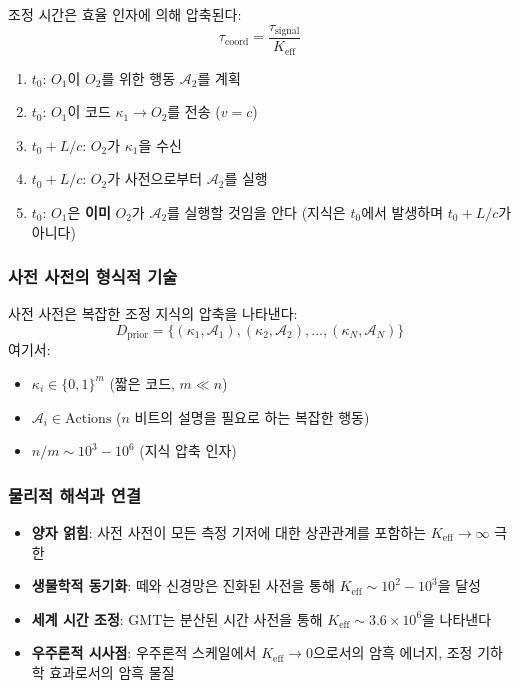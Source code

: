 \documentclass[11pt,a4paper]{article}
\begin{document}
조정 시간은 효율 인자에 의해 압축된다:
\begin{equation}
	\tau_{\text{coord}} = \frac{\tau_{\text{signal}}}{K_{\mathrm{eff}}}
\end{equation}

\begin{enumerate}[label=\arabic*.]
	\item $t_0$: $O_1$이 $O_2$를 위한 행동 $\mathcal{A}_2$를 계획
	\item $t_0$: $O_1$이 코드 $\kappa_1 \to O_2$를 전송 ($v = c$)
	\item $t_0 + L/c$: $O_2$가 $\kappa_1$을 수신
	\item $t_0 + L/c$: $O_2$가 사전으로부터 $\mathcal{A}_2$를 실행
	\item $t_0$: $O_1$은 \textbf{이미} $O_2$가 $\mathcal{A}_2$를 실행할 것임을 안다 (지식은 $t_0$에서 발생하며 $t_0 + L/c$가 아니다)
\end{enumerate}

\subsubsection{사전 사전의 형식적 기술}

사전 사전은 복잡한 조정 지식의 압축을 나타낸다:
\begin{equation}
	D_{\text{prior}} = \{(\kappa_1, \mathcal{A}_1), (\kappa_2, \mathcal{A}_2), \dots, (\kappa_N, \mathcal{A}_N)\}
\end{equation}
여기서:
\begin{itemize}
	\item $\kappa_i \in \{0,1\}^m$ (짧은 코드, $m \ll n$)
	\item $\mathcal{A}_i \in \text{Actions}$ ($n$ 비트의 설명을 필요로 하는 복잡한 행동)
	\item $n/m \sim 10^3-10^6$ (지식 압축 인자)
\end{itemize}

\subsubsection{물리적 해석과 연결}

\begin{itemize}
	\item \textbf{양자 얽힘}: 사전 사전이 모든 측정 기저에 대한 상관관계를 포함하는 $K_{\mathrm{eff}} \to \infty$ 극한
	\item \textbf{생물학적 동기화}: 떼와 신경망은 진화된 사전을 통해 $K_{\mathrm{eff}} \sim 10^2-10^3$을 달성
	\item \textbf{세계 시간 조정}: GMT는 분산된 시간 사전을 통해 $K_{\mathrm{eff}} \sim 3.6\times10^6$을 나타낸다
	\item \textbf{우주론적 시사점}: 우주론적 스케일에서 $K_{\mathrm{eff}} \to 0$으로서의 암흑 에너지, 조정 기하학 효과로서의 암흑 물질
\end{itemize}
\end{document}
